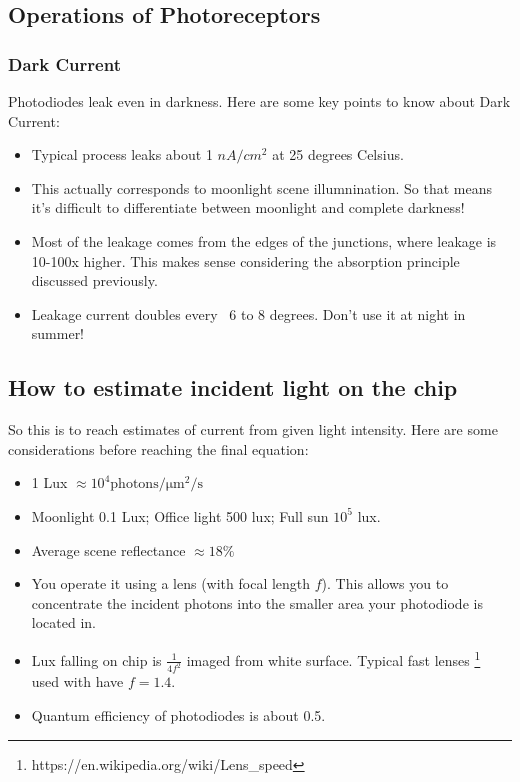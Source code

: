 \subsection{Operations of Photoreceptors}

\subsubsection{Dark Current}

Photodiodes leak even in darkness. Here are some key points to know about Dark Current:
\begin{itemize}
    \item Typical process leaks about 1 $nA/cm^2$ at 25 degrees Celsius.
    \item This actually corresponds to moonlight scene illumnination. So that means it's difficult to differentiate between moonlight and complete darkness!
    \item Most of the leakage comes from the edges of the junctions, where leakage is 10-100x higher. This makes sense considering the absorption principle discussed previously. 
    \item Leakage current doubles every ~6 to 8 degrees. Don't use it at night in summer!
\end{itemize}

\subsection{How to estimate incident light on the chip}

So this is to reach estimates of current from given light intensity. Here are some considerations before reaching the final equation: 

\begin{itemize}
    \item 1 Lux $\approx 10^4 \mathrm{photons/\mu m^2/s}$
    \item Moonlight 0.1 Lux; Office light 500 lux; Full sun $10^5$ lux.
    \item Average scene reflectance $\approx 18\%$
    \item You operate it using a lens (with focal length $f$). This allows you to concentrate the incident photons into the smaller area your photodiode is located in.   
    \item Lux falling on chip is $\frac{1}{4 f^2}$ imaged from white surface. Typical fast lenses \footnote{https://en.wikipedia.org/wiki/Lens_speed} used with have $f = 1.4$.
    \item Quantum efficiency of photodiodes is about 0.5.
\end{itemize}

